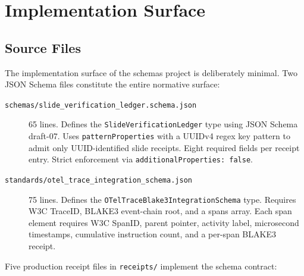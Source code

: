 
\section{Implementation Surface}
\label{sec:schemas-implementation}

\subsection{Source Files}
\label{sec:schemas-implementation-source}

The implementation surface of the schemas project is deliberately minimal. Two JSON Schema files
constitute the entire normative surface:

\begin{description}
  \item[\texttt{schemas/slide\_verification\_ledger.schema.json}] 65 lines. Defines the
    \texttt{SlideVerificationLedger} type using JSON Schema draft-07. Uses
    \texttt{patternProperties} with a UUIDv4 regex key pattern to admit only UUID-identified
    slide receipts. Eight required fields per receipt entry. Strict enforcement via
    \texttt{additionalProperties: false}.
  \item[\texttt{standards/otel\_trace\_integration\_schema.json}] 75 lines. Defines the
    \texttt{OTelTraceBlake3IntegrationSchema} type. Requires W3C TraceID, BLAKE3 event-chain root,
    and a spans array. Each span element requires W3C SpanID, parent pointer, activity label,
    microsecond timestamps, cumulative instruction count, and a per-span BLAKE3 receipt.
\end{description}

Five production receipt files in \texttt{receipts/} implement the schema contract:

